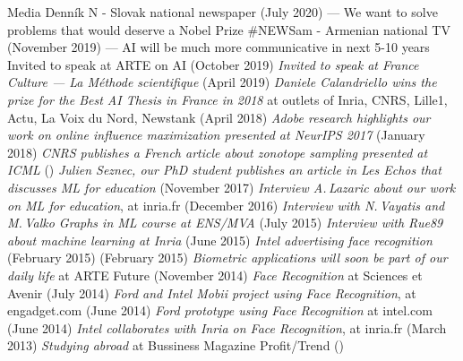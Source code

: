 \documentclass{resume}
\begin{document}
\begin{category}{Media}
Denn\' ik N - Slovak national newspaper ({\sf  July 2020}) --- We want to solve problems that would deserve a Nobel Prize
\citembullet
\#NEWSam - Armenian national TV ({\sf  November 2019}) --- AI will be much more communicative in next 5-10 years
\citembullet
Invited to speak at ARTE on AI ({\sf October 2019})
\citembullet
\emph{Invited to speak at France Culture --- La M\'ethode scientifique} ({\sf April 2019})
\citembullet
\emph{Daniele Calandriello wins the prize for the Best AI Thesis in France in 2018} 
at outlets of Inria, CNRS, Lille1,  Actu,  La Voix du Nord, Newstank
({\sf April 2018})
\citembullet
\emph{Adobe research highlights our work on online influence maximization presented at NeurIPS 2017} ({\sf January 2018})
\citembullet
\emph{CNRS publishes a French article about zonotope sampling presented at ICML} ({})
\citembullet
\emph{Julien Seznec, our PhD student publishes an article in  Les Echos that discusses ML for education} ({\sf November 2017})
\citembullet
\emph{Interview A.\,Lazaric about our work on ML for education}, at inria.fr ({\sf December 2016})
\citembullet
\emph{Interview with N.\,Vayatis and M.\,Valko Graphs in ML course at ENS/MVA} ({\sf July 2015})
\citembullet
\emph{Interview with Rue89 about machine learning at Inria} ({\sf June 2015})
\citembullet
\emph{Intel advertising face recognition} (February 2015) ({\sf February 2015})
\citembullet
\emph{Biometric applications will soon be part of our daily life} at ARTE Future ({\sf November 2014})
\citembullet
\emph{Face Recognition} at Sciences et Avenir ({\sf July 2014})
\citembullet
\emph{Ford and Intel Mobii project using Face Recognition}, at engadget.com ({\sf June 2014}) 
\citembullet
\emph{Ford prototype using Face Recognition} at intel.com ({\sf June 2014}) 
\citembullet
\emph{Intel collaborates with Inria on Face Recognition}, at inria.fr ({\sf March 2013}) 
\citembullet
\emph{Studying abroad} at Bussiness Magazine Profit/Trend  ({})
 \end{category}







\end{document}
